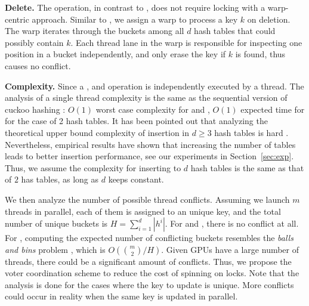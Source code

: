 \vspace{1mm}\noindent\textbf{Delete.} The  operation, in contrast to , does not require locking with a warp-centric approach. 
Similar to , we assign a warp to process a key $k$ on deletion. The warp iterates through the buckets among all $d$ hash tables that could possibly contain $k$. Each thread lane in the warp is responsible for inspecting one position in a bucket independently, and only erase the key if $k$ is found, thus causes no conflict.



\vspace{1mm}\noindent\textbf{Complexity.}
Since a ,  and  operation is independently executed by a thread. 
The analysis of a single thread complexity is the same as the sequential version of cuckoo hashing \cite{pagh2004cuckoo}: $O(1)$ worst case complexity for  and , $O(1)$ expected time for  for the case of 2 hash tables. 
It has been pointed out that analyzing the theoretical upper bound complexity of insertion in $d \geq 3$ hash tables is hard \cite{alcantara2009real}.  
Nevertheless, empirical results have shown that increasing the number of tables leads to better insertion performance, see our experiments in Section~\ref{sec:exp}.
Thus, we assume the complexity for inserting to $d$ hash tables is the same as that of $2$ has tables, as long as $d$ keeps constant.  

We then analyze the number of possible thread conflicts. Assuming we launch $m$ threads in parallel, each of them is assigned to an unique key, and the total number of unique buckets is $H=\sum_{i=1}^d|h^i|$. For  and , there is no conflict at all. 
For , computing the expected number of conflicting buckets resembles the \emph{balls and bins} problem \cite{raab1998balls}, which is $O(\binom{m}{2}/H)$. 
Given GPUs have a large number of threads, there could be a significant amount of conflicts. Thus, we propose the voter coordination scheme to reduce the cost of spinning on locks. Note that the analysis is done for the cases where the key to update is unique. More conflicts could occur in reality when the same key is updated in parallel. 